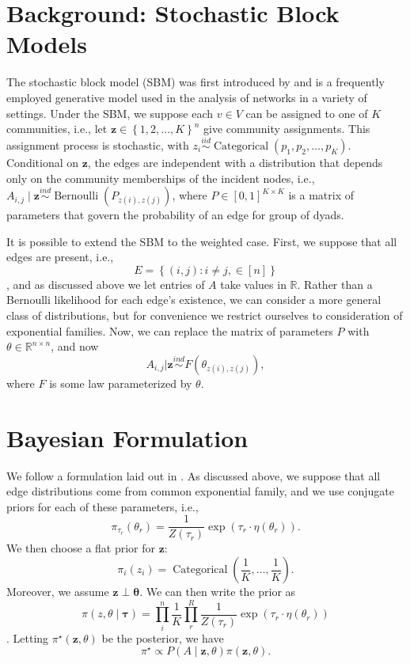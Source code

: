 \documentclass[12pt]{article}   %
\newcommand{\V}[1]{\ensuremath{\boldsymbol{#1}}}
\newcommand{\M}[1]{\ensuremath{#1}}
\begin{document}
\section{Background: Stochastic Block Models}
\label{sec:backgr-stoch-block}
The stochastic block model (SBM) was first introduced by \textcite{holland_stochastic_1983} and is a frequently employed generative model used in the analysis of networks in a variety of settings.
Under the SBM, we suppose each $v \in V$ can be assigned to one of $K$ communities, i.e., let $\V{z} \in \left\{ 1, 2, \ldots, K \right\}^n$ give community assignments.
This assignment process is stochastic, with $z_i \overset{iid}{\sim} \operatorname{Categorical}(p_1, p_2, \ldots, p_K)$.
Conditional on $\V{z}$, the edges are independent with a distribution that depends only on the community memberships of the incident nodes, i.e., $\M{A}_{i,j} \mid \V{z} \overset{ind}{\sim} \operatorname{Bernoulli}(\M{P}_{z(i),z(j)})$, where
$\M{P} \in \left[ 0, 1 \right]^{K \times K}$ is a matrix of parameters that govern the probability of an edge for group of dyads.

It is possible to extend the SBM to the weighted case.
First, we suppose that all edges are present, i.e.,
$$E = \left\{ (i,j) : i \neq j, \in [n] \right\}$$, and as discussed above we let entries of $A$ take values in $\mathbb{R}$.
Rather than a Bernoulli likelihood for each edge's existence, we can consider a more general class of distributions, but for convenience we restrict ourselves to consideration of exponential families.
Now, we can replace the matrix of parameters $P$ with $\theta \in \mathbb{R}^{n \times n}$, and now $$\M{A}_{i,j} | \V{z} \overset{ind}{\sim} F(\M{\theta}_{z(i),z(j)}),$$ where $F$ is some law parameterized by $\M{\theta}$.




\section{Bayesian Formulation}
\label{sec:bayesian-formulation}

We follow a formulation laid out in \textcite{aicher_adapting_2013,aicher_learning_2015}.
As discussed above, we suppose that all edge distributions come from common exponential family, and we use conjugate priors for each of these parameters, i.e.,
\begin{equation*}
\pi_{\tau_r}(\theta_r) = \frac{1}{Z(\tau_r)} \exp(\tau_r \cdot  \eta(\theta_r)).
\end{equation*}
We then choose a flat prior for $\V{z}$:
\begin{equation*}
\pi_i(z_i) = \operatorname{Categorical}\left( \frac{1}{K}, \ldots, \frac{1}{K} \right).\label{eq:1}
\end{equation*}
Moreover, we assume $\V{z} \perp \V{\theta}$.
We can then write the prior as
$$\pi(z, \theta \mid \V{\tau}) = \prod_i^n \frac{1}{K} \prod_r^R \frac{1}{Z(\tau_r)} \exp( \tau_r \cdot \eta(\theta_r))$$.
Letting $\pi^{\star}(\V{z}, \M{\theta})$ be the posterior, we have
\begin{equation*}
  \pi^{\star} \propto P(A \mid \V{z}, \M{\theta}) \pi(\V{z}, \M{\theta}).
\end{equation*}
\end{document}
